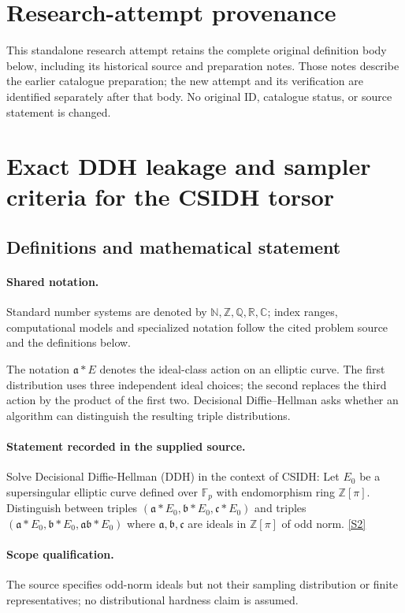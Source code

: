 \documentclass[11pt]{article}
\begin{document}
\section*{Research-attempt provenance}
This standalone research attempt retains the complete original definition body below,
including its historical source and preparation notes. Those notes describe the
earlier catalogue preparation; the new attempt and its verification are identified
separately after that body. No original ID, catalogue status, or source statement is changed.

\section{Exact DDH leakage and sampler criteria for the CSIDH torsor}\label{statement}

\subsection{Definitions and mathematical statement}

\paragraph{Shared notation.}Standard number systems are denoted by $\mathbb N,\mathbb Z,\mathbb Q,\mathbb R,\mathbb C$; index ranges, computational models and specialized notation follow the cited problem source and the definitions below.


The notation $\mathfrak a*E$ denotes the ideal-class action on an elliptic curve. The first distribution uses three independent ideal choices; the second replaces the third action by the product of the first two. Decisional Diffie--Hellman asks whether an algorithm can distinguish the resulting triple distributions.
\paragraph{Statement recorded in the supplied source.}
Solve Decisional Diffie-Hellman (DDH) in the context of CSIDH: Let $E_0$ be a supersingular elliptic curve defined over $\mathbb F_p$ with endomorphism ring $\mathbb Z[\pi]$. Distinguish between triples $(\mathfrak a * E_0, \mathfrak b* E_0,\mathfrak c* E_0)$ and triples $(\mathfrak a * E_0, \mathfrak b* E_0,\mathfrak a\mathfrak b * E_0)$ where $\mathfrak a, \mathfrak b, \mathfrak c$ are ideals in $\mathbb Z[\pi]$ of odd norm. \href{http://aimpl.org/quantumalg/5/}{[S2]}
\paragraph{Scope qualification.}
The source specifies odd-norm ideals but not their sampling distribution or finite representatives; no distributional hardness claim is assumed.
\end{document}
